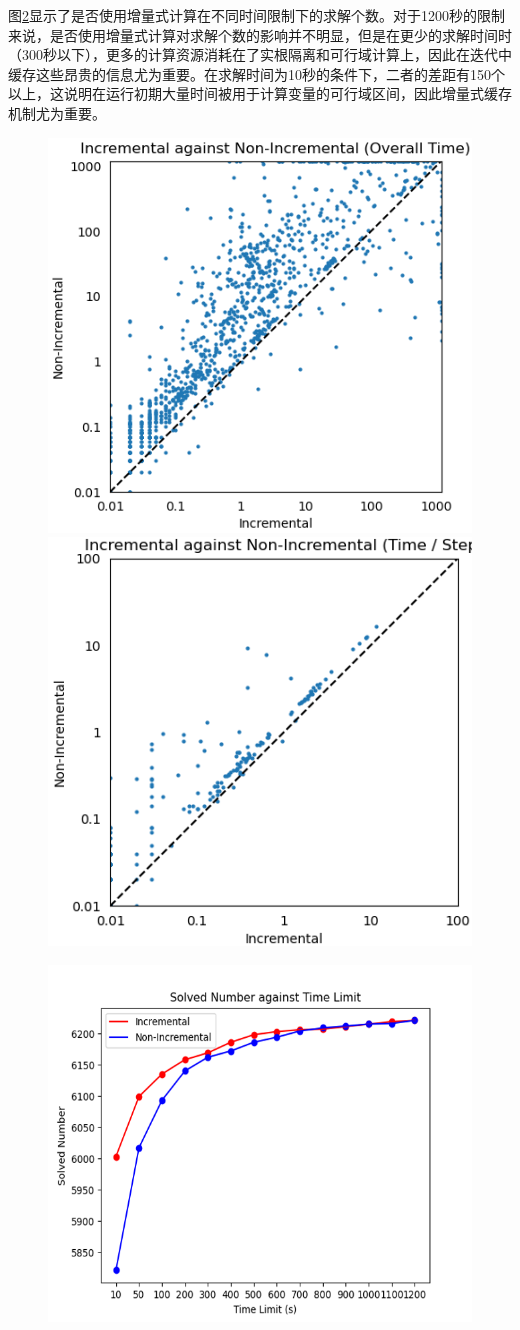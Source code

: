 图\ref{fig:time_inc}显示了是否使用增量式计算在不同时间限制下的求解个数。对于1200秒的限制来说，是否使用增量式计算对求解个数的影响并不明显，但是在更少的求解时间时（300秒以下），更多的计算资源消耗在了实根隔离和可行域计算上，因此在迭代中缓存这些昂贵的信息尤为重要。在求解时间为10秒的条件下，二者的差距有150个以上，这说明在运行初期大量时间被用于计算变量的可行域区间，因此增量式缓存机制尤为重要。

\begin{figure}[t]
    \centering
    \includegraphics[width=0.45\columnwidth]{Img/scatter_inc_ninc_time.png}\qquad
    \includegraphics[width=0.45\columnwidth]{Img/scatter_inc_ninc_pertime.png}
\label{fig:scatter_inc}
\end{figure}
\begin{figure}[t]
    \centering
    \includegraphics[width=0.7\columnwidth]{Img/time_inc.png}
\label{fig:time_inc}
\end{figure}



